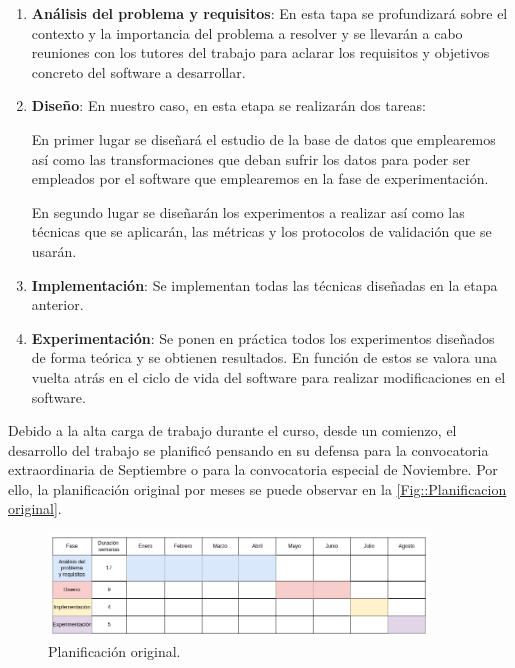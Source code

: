     \begin{enumerate}
        \item \textbf{Análisis del problema y requisitos}: En esta tapa se profundizará sobre el contexto y la importancia del problema a resolver y se llevarán a cabo reuniones con los tutores del trabajo para aclarar los requisitos y objetivos concreto del software a desarrollar. 
        \item \textbf{Diseño}: En nuestro caso, en esta etapa se realizarán dos tareas: 
        
        En primer lugar se diseñará el estudio de la base de datos que emplearemos así como las transformaciones que deban sufrir los datos para poder ser empleados por el software que emplearemos en la fase de experimentación. 

        En segundo lugar se diseñarán los experimentos a realizar así como las técnicas que se aplicarán, las métricas y los protocolos de validación que se usarán.

        \item \textbf{Implementación}: Se implementan todas las técnicas diseñadas en la etapa anterior.
        \item \textbf{Experimentación}: Se ponen en práctica todos los experimentos diseñados de forma teórica y se obtienen resultados. En función de estos se valora una vuelta atrás en el ciclo de vida del software para realizar modificaciones en el software.
    \end{enumerate}
    
    \medskip

    \noindent Debido a la alta carga de trabajo durante el curso, desde un comienzo, el desarrollo del trabajo se planificó pensando en su defensa para la convocatoria extraordinaria de Septiembre o para la convocatoria especial de Noviembre. Por ello, la planificación original por meses se puede observar en la \autoref{Fig::Planificacion original}.


    \begin{figure}[!h]
        \centering
        \includegraphics[width=0.9\textwidth]{img/plan_provisional.png}
        \caption{Planificación original.}
        \label{Fig::Planificacion original}
    \end{figure}

